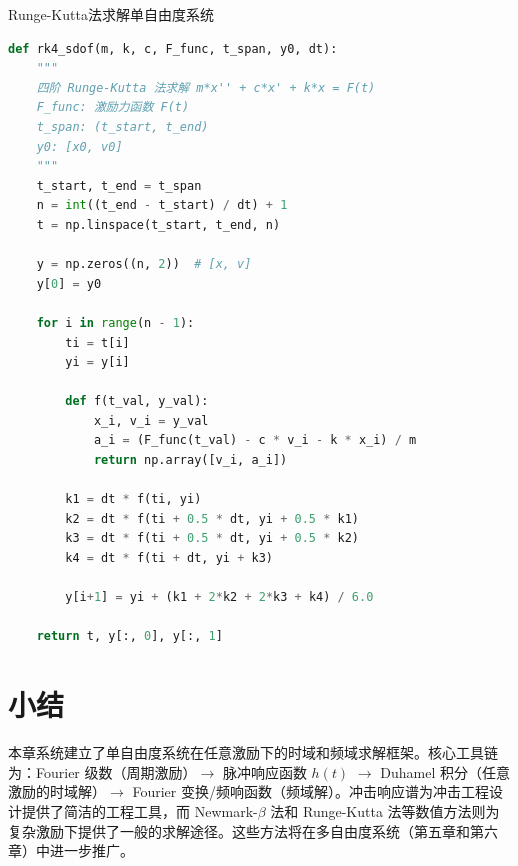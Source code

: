 \begin{mycode}{Runge-Kutta法求解单自由度系统}
\begin{lstlisting}[language=Python]
def rk4_sdof(m, k, c, F_func, t_span, y0, dt):
    """
    四阶 Runge-Kutta 法求解 m*x'' + c*x' + k*x = F(t)
    F_func: 激励力函数 F(t)
    t_span: (t_start, t_end)
    y0: [x0, v0]
    """
    t_start, t_end = t_span
    n = int((t_end - t_start) / dt) + 1
    t = np.linspace(t_start, t_end, n)

    y = np.zeros((n, 2))  # [x, v]
    y[0] = y0

    for i in range(n - 1):
        ti = t[i]
        yi = y[i]

        def f(t_val, y_val):
            x_i, v_i = y_val
            a_i = (F_func(t_val) - c * v_i - k * x_i) / m
            return np.array([v_i, a_i])

        k1 = dt * f(ti, yi)
        k2 = dt * f(ti + 0.5 * dt, yi + 0.5 * k1)
        k3 = dt * f(ti + 0.5 * dt, yi + 0.5 * k2)
        k4 = dt * f(ti + dt, yi + k3)

        y[i+1] = yi + (k1 + 2*k2 + 2*k3 + k4) / 6.0

    return t, y[:, 0], y[:, 1]
\end{lstlisting}
\end{mycode}

\section{小结}

本章系统建立了单自由度系统在任意激励下的时域和频域求解框架。核心工具链为：Fourier 级数（周期激励）$\to$ 脉冲响应函数 $h(t)$ $\to$ Duhamel 积分（任意激励的时域解）$\to$ Fourier 变换/频响函数（频域解）。冲击响应谱为冲击工程设计提供了简洁的工程工具，而 Newmark-$\beta$ 法和 Runge-Kutta 法等数值方法则为复杂激励下提供了一般的求解途径。这些方法将在多自由度系统（第五章和第六章）中进一步推广。
